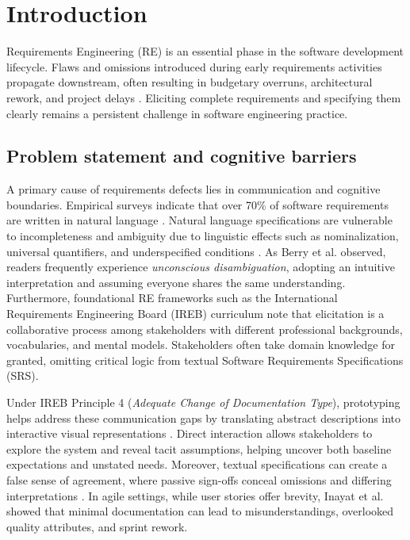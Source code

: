 \section{Introduction}
\label{sec:introduction}

Requirements Engineering (RE) is an essential phase in the software development lifecycle. Flaws and omissions introduced during early requirements activities propagate downstream, often resulting in budgetary overruns, architectural rework, and project delays \cite{pohl2016requirements, davis2018maturity}. Eliciting complete requirements and specifying them clearly remains a persistent challenge in software engineering practice.

\subsection{Problem statement and cognitive barriers}
A primary cause of requirements defects lies in communication and cognitive boundaries. Empirical surveys indicate that over 70\% of software requirements are written in natural language \cite{berry2003contract}. Natural language specifications are vulnerable to incompleteness and ambiguity due to linguistic effects such as nominalization, universal quantifiers, and underspecified conditions \cite{pohl2016requirements, berry2003contract}. As Berry et al. \cite{berry2003contract} observed, readers frequently experience \textit{unconscious disambiguation}, adopting an intuitive interpretation and assuming everyone shares the same understanding. Furthermore, foundational RE frameworks such as the International Requirements Engineering Board (IREB) curriculum \cite{pohl2016requirements} note that elicitation is a collaborative process among stakeholders with different professional backgrounds, vocabularies, and mental models. Stakeholders often take domain knowledge for granted, omitting critical logic from textual Software Requirements Specifications (SRS).

Under IREB Principle 4 (\textit{Adequate Change of Documentation Type}), prototyping helps address these communication gaps by translating abstract descriptions into interactive visual representations \cite{pohl2016requirements}. Direct interaction allows stakeholders to explore the system and reveal tacit assumptions, helping uncover both baseline expectations and unstated needs. Moreover, textual specifications can create a false sense of agreement, where passive sign-offs conceal omissions and differing interpretations \cite{ferrari2016ambiguity, cascon2025ambiguity}. In agile settings, while user stories offer brevity, Inayat et al. \cite{inayat2015systematic} showed that minimal documentation can lead to misunderstandings, overlooked quality attributes, and sprint rework.

